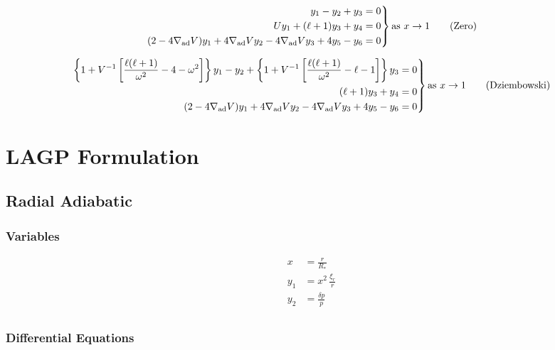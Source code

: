 \documentclass[fleqn]{article}
\newcommand{\nabad}{\ensuremath{\nabla_{\rm ad}}}
\newcommand{\Rstar}{\ensuremath{R_{\ast}}}
\begin{document}
\begin{equation*}
\left.
\begin{aligned}
y_{1} - y_{2} + y_{3} &= 0 \\
U y_{1} + (\ell + 1) y_{3} + y_{4} &= 0 \\
(2 - 4\nabad V) y_{1} + 4 \nabad V y_{2} - 4 \nabad V y_{3} + 4 y_{5} - y_{6} &= 0
\end{aligned}
\right\}
\text{as}\ x \rightarrow 1 \qquad \text{(Zero)}
\end{equation*}

\begin{equation*}
\left.
\begin{aligned}
\left\{ 1 + V^{-1} \left[ \frac{\ell(\ell+1)}{\omega^{2}} - 4 - \omega^{2} \right] \right\} y_{1} -
y_{2} +
\left\{ 1 + V^{-1} \left[ \frac{\ell(\ell+1)}{\omega^{2}} - \ell - 1 \right] \right\} y_{3} &= 0 \\
(\ell + 1) y_{3} + y_{4} &= 0 \\
(2 - 4\nabad V) y_{1} + 4 \nabad V y_{2} - 4 \nabad V y_{3} + 4 y_{5} - y_{6} &= 0
\end{aligned}
\right\}
\text{as}\ x \rightarrow 1 \qquad \text{(Dziembowski)}
\end{equation*}


\newpage

\section*{LAGP Formulation}

\subsection*{Radial Adiabatic}

\subsubsection*{Variables}

\begin{align*}
x     &= \frac{r}{\Rstar} \\
y_{1} &= x^{2}\, \frac{\xi_{r}}{r} \\
y_{2} &=         \frac{\delta p}{p} \\
\end{align*}

\subsubsection*{Differential Equations}
\end{document}
